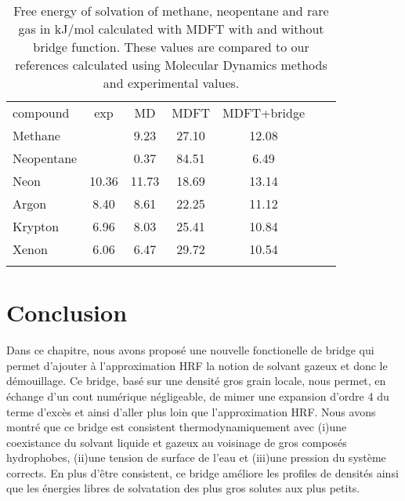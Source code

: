 \begin{table}
  \begin{tabular}{ l c c c c c c }
    \hline & \\[-1em]\hline
    compound   & exp  & MD & MDFT & MDFT+bridge \\
    \hline
    Methane    &       &  9.23 & 27.10 & 12.08 \\
    Neopentane &       &  0.37 & 84.51 &  6.49 \\ 
    Neon       & 10.36 & 11.73 & 18.69 & 13.14 \\
    Argon      &  8.40 &  8.61 & 22.25 & 11.12 \\
    Krypton    &  6.96 &  8.03 & 25.41 & 10.84 \\
    Xenon      &  6.06 &  6.47 & 29.72 & 10.54 \\
    \hline & \\[-1em]\hline
  \end{tabular}
  \caption{Free energy of solvation of methane, neopentane and rare gas in kJ/mol calculated with MDFT with and without bridge function. These values are compared to our references calculated using Molecular Dynamics methods and experimental values\cite{straatsma_free_1986}.}
  \label{tab:deltag}  
\end{table}







\section{Conclusion}

Dans ce chapitre, nous avons proposé une nouvelle fonctionelle de bridge qui permet d'ajouter à l'approximation HRF la notion de solvant gazeux et donc le démouillage. Ce bridge, basé sur une densité gros grain locale, nous permet, en échange d'un cout numérique négligeable, de mimer une expansion d'ordre 4 du terme d'excès et ainsi d'aller plus loin que l'approximation HRF. Nous avons montré que ce bridge est consistent thermodynamiquement avec (i)une coexistance du solvant liquide et gazeux au voisinage de gros composés hydrophobes, (ii)une tension de surface de l'eau et (iii)une pression du système corrects. En plus d'être consistent, ce bridge améliore les profiles de densités ainsi que les énergies libres de solvatation des plus gros solutes aux plus petits.




\printbibliography[segment=\therefsegment,heading=subbibliography]




